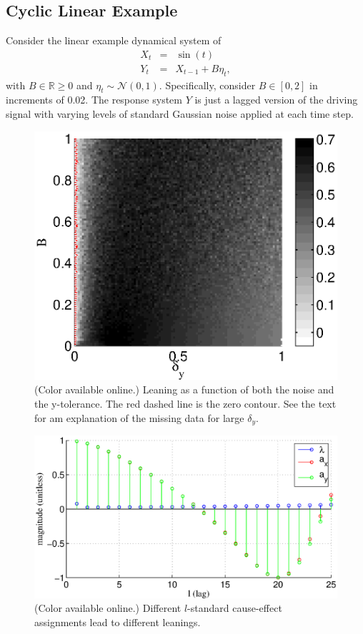 \documentclass[a4paper,11pt,twocolumn]{article}
\begin{document}
\subsection{Cyclic Linear Example}
Consider the linear example dynamical system of
\begin{eqnarray}
\label{eq:linearex}
X_t &=& \sin(t)\\
Y_t &=& X_{t-1}+B\eta_t,
\end{eqnarray}
with $B\in\mathbb{R}\ge 0$ and $\eta_t\sim\mathcal{N}\left(0,1\right)$.  Specifically, consider $B\in[0,2]$ in increments of 0.02.  The response system $Y$ is just a lagged version of the driving signal with varying levels of standard Gaussian noise applied at each time step.  
\begin{figure}[ht]
\includegraphics[scale=0.65]{SimpleCyclicexample_Bdy.eps}
\caption{(Color available online.) Leaning as a function of both the noise and the y-tolerance.  The red dashed line is the zero contour.  See the text for am explanation of the missing data for large $\delta_y$.}
\end{figure}
\begin{figure}[ht]
\includegraphics[scale=0.45]{SimpleCyclicexample_difflags.eps}
\caption{(Color available online.) Different $l$-standard cause-effect assignments lead to different leanings.}
\end{figure}
\end{document}

